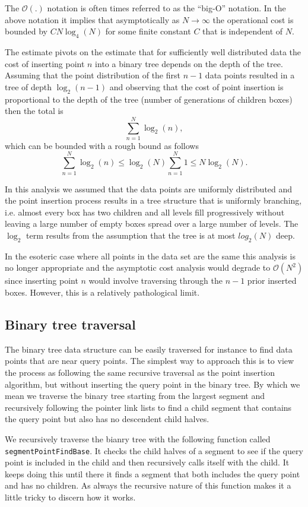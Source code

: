 The $\mathcal{O}(.)$ notation is often times referred to as the ``big-O'' notation. In the above notation it implies that asymptotically as $N\rightarrow\infty$ the operational cost is bounded by $CN\log_4(N)$ for some finite constant $C$ that is independent of $N$. 

The estimate pivots on the estimate that for sufficiently well distributed data the cost of inserting point $n$ into a binary tree depends on the depth of the tree. Assuming that the point distribution of the first $n-1$ data points resulted in a tree of depth $\log_2(n-1)$ and observing that the cost of point insertion is proportional to the depth of the tree (number of generations of children boxes) then the total is
\[
\sum_{n=1}^{N} \log_2(n),
\]
which can be bounded with a rough bound as follows
\[
\sum_{n=1}^{N} \log_2(n) \leq \log_2(N) \sum_{n=1}^{N} 1 \leq N\log_2(N). 
\]

In this analysis we assumed that the data points are uniformly distributed and the point insertion process results in a tree structure that is uniformly branching, i.e. almost every box has two children and all levels fill progressively without leaving a large number of empty boxes spread over a large number of levels. The $\log_2$ term results from the assumption that the tree is at most $log_2(N)$ deep. 

In the esoteric case where all points in the data set are the same this analysis is no longer appropriate and the asymptotic cost analysis would degrade to $\mathcal{O}(N^2)$ since inserting point $n$ would involve traversing through the $n-1$ prior inserted boxes. However, this is a relatively pathological limit.

\subsection{Binary tree traversal}

The binary tree data structure can be easily traversed for instance to find data points that are near query points. The simplest way to approach this is to view the process as following the same recursive traversal as the point insertion algorithm, but without inserting the query point in the binary tree. By which we mean we traverse the binary tree starting from the largest segment and recursively following the pointer link lists to find a child segment that contains the query point but also has no descendent child halves. 

We recursively traverse the bianry tree with the following function called \texttt{segmentPointFindBase}. It checks the child halves of a segment to see if the query point is included in the child and then recursively calls itself with the child. It keeps doing this until there it finds a segment that both includes the query point and has no children. As always the recursive nature of this function makes it a little tricky to discern how it works.

